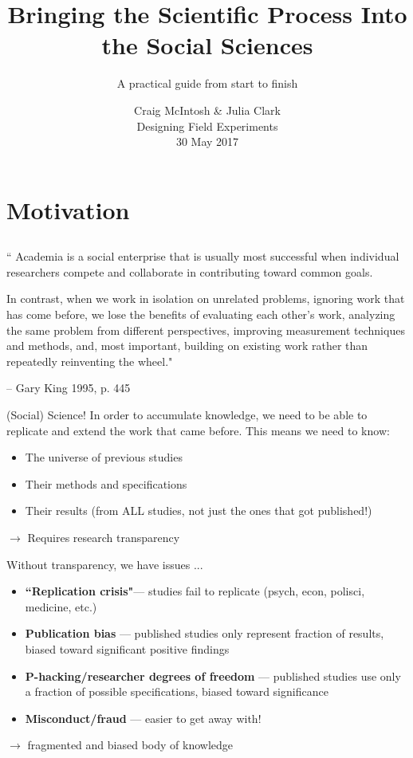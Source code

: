 \documentclass[12pt, compress]{beamer} %
\title[Short Title]{Bringing the Scientific Process Into the Social Sciences}
\subtitle{A practical guide from start to finish \vspace{-20pt} }
\institute{\vspace{10pt} \ig[width = 40mm]{pdel.png}\vspace{10pt} \ig[width = 20mm]{UCSDlogo}}
\date[Short Occasion]{Craig McIntosh \& Julia Clark \\ Designing Field Experiments \\ 30 May 2017}
\let\noteitem\item %
\renewcommand{\item}{ 
	\noteitem\vspace{\fill}
	}
\newcommand{\nb}[1]{{\color{burntorange} {#1}}}
\begin{document}

{ %
\frame{
  \titlepage
  \note{}
  }
}

\section{Motivation}
\subsection{}
	\begin{frame}
		``\nb{Academia is a social enterprise} that is usually most successful when individual researchers \nb{compete and collaborate} in contributing toward common goals. 
		
		\bigskip
		In contrast, when we work in isolation on unrelated problems, ignoring work that has come before, we lose the benefits of evaluating each other's work, analyzing the same problem from different perspectives, improving measurement techniques and methods, and, most important, \nb{building on existing work rather than repeatedly reinventing the wheel}."
		
		\bigskip
		 -- Gary King 1995, p. 445
	\end{frame}

	\begin{frame}{(Social) Science!}
		 In order to \nb{accumulate knowledge}, we need to be able to replicate and extend the work that came before. This means we need to know:
		 
		 \begin{itemize}
		 	\item The universe of previous studies
		 	\item Their methods and specifications
		 	\item Their results (from ALL studies, not just the ones that got published!)
		 \end{itemize}
		 \bigskip
		 
		 $\rightarrow$ Requires research \nb{transparency}
	\end{frame}

	\begin{frame}{Without transparency, we have issues ...}
	
		\begin{itemize}
			\item \textbf{``Replication crisis"}--- studies fail to replicate (psych, econ, polisci, medicine, etc.)
			\item \textbf{Publication bias} --- published studies only represent fraction of results, biased toward significant positive findings
			\item \textbf{P-hacking/researcher degrees of freedom} --- published studies use only a fraction of possible specifications, biased toward significance 
			\item \textbf{Misconduct/fraud} --- easier to get away with!
		\end{itemize}			
		\bigskip
		
		$\rightarrow$ \nb{fragmented} and \nb{biased} body of knowledge
		
	\end{frame}
	
\end{document}
